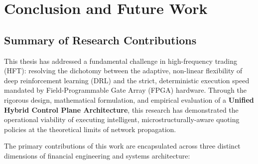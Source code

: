 \chapter{Conclusion and Future Work}
\label{ch:conclusion}

\section{Summary of Research Contributions}
This thesis has addressed a fundamental challenge in high-frequency trading (HFT): resolving the dichotomy between the adaptive, non-linear flexibility of deep reinforcement learning (DRL) and the strict, deterministic execution speed mandated by Field-Programmable Gate Array (FPGA) hardware. Through the rigorous design, mathematical formulation, and empirical evaluation of a \textbf{Unified Hybrid Control Plane Architecture}, this research has demonstrated the operational viability of executing intelligent, microstructurally-aware quoting policies at the theoretical limits of network propagation.

The primary contributions of this work are encapsulated across three distinct dimensions of financial engineering and systems architecture:

